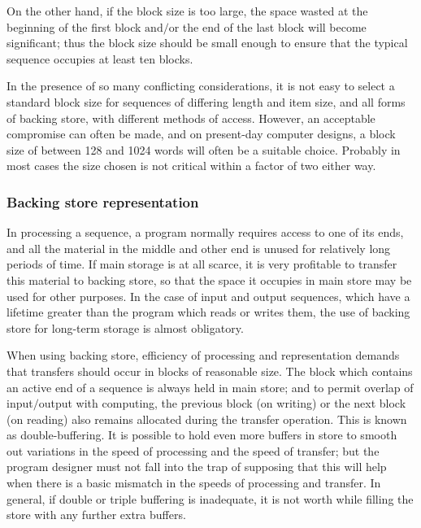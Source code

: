 \documentclass[twoside,11pt]{book}
\begin{document}
On the other hand, if the block size is too large, the space wasted at the beginning of the first block $\text{and}/\text{or}$ the end of the last block will become significant; thus the block size should be small enough to ensure that the typical sequence occupies at least ten blocks.

In the presence of so many conflicting considerations, it is not easy to select a standard block size for sequences of differing length and item size, and all forms of backing store, with different methods of access. However, an acceptable compromise can often be made, and on present-day computer designs, a block size of between 128 and 1024 words will often be a suitable choice. Probably in most cases the size chosen is not critical within a factor of two either way.

\subsubsection{Backing store representation}

In processing a sequence, a program normally requires access to one of its ends, and all the material in the middle and other end is unused for relatively long periods of time. If main storage is at all scarce, it is very profitable to transfer this material to backing store, so that the space it occupies in main store may be used for other purposes. In the case of input and output sequences, which have a lifetime greater than the program which reads or writes them, the use of backing store for long-term storage is almost obligatory.

When using backing store, efficiency of processing and representation demands that transfers should occur in blocks of reasonable size. The block which contains an active end of a sequence is always held in main store; and to permit overlap of input$/$output with computing, the previous block (on writing) or the next block (on reading) also remains allocated during the transfer operation. This is known as double-buffering. It is possible to hold even more buffers in store to smooth out variations in the speed of processing and the speed of transfer; but the program designer must not fall into the trap of supposing that this will help when there is a basic mismatch in the speeds of processing and transfer. In general, if double or triple buffering is inadequate, it is not worth while filling the store with any further extra buffers.
\end{document}
